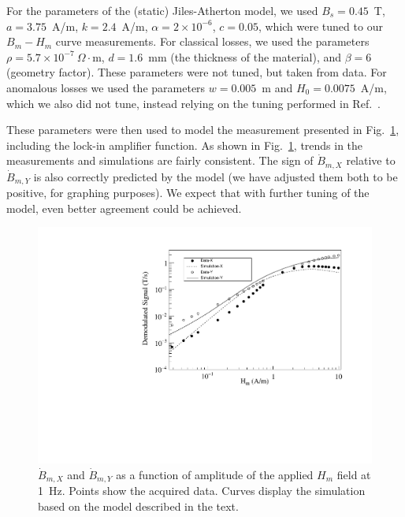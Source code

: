 For the parameters of the (static) Jiles-Atherton model, we used
$B_s=0.45$~T, $a=3.75$~A/m, $k=2.4$~A/m, $\alpha=2\times 10^{-6}$,
$c=0.05$, which were tuned to our $B_m-H_m$ curve measurements.  For
classical losses, we used the parameters $\rho=5.7\times
10^{-7}~\Omega\cdot$m, $d=1.6$~mm (the thickness of the material), and
$\beta=6$ (geometry factor).  These parameters were not tuned, but
taken from data.  For anomalous losses we used the parameters
$w=0.005$~m and $H_0=0.0075$~A/m, which we also did not tune, instead
relying on the tuning performed in Ref.~\cite{bib:jiles}.

These parameters were then used to model the measurement presented in
Fig.~\ref{fig:data_and_simulation}, including the lock-in amplifier
function.  As shown in Fig.~\ref{fig:data_and_simulation}, trends in
the measurements and simulations are fairly consistent.  The sign of
$\dot{B}_{m,X}$ relative to $\dot{B}_{m,Y}$ is also correctly
predicted by the model (we have adjusted them both to be positive, for
graphing purposes).  We expect that with further tuning of the model,
even better agreement could be achieved.

\begin{figure}[h!]
  \begin{center}
    \includegraphics[width=\textwidth]{Jiles_and_data.pdf}
    \caption{$\dot{B}_{m,X}$ and $\dot{B}_{m,Y}$ as a function of
      amplitude of the applied $H_m$ field at 1~Hz.  Points show the
      acquired data.  Curves display the simulation based on the model
      described in the text.}
    \label{fig:data_and_simulation}
  \end{center}
\end{figure} 

